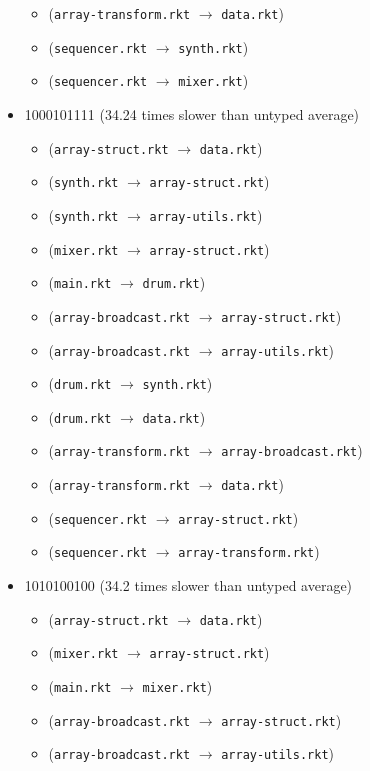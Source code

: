 \documentclass{article}
\newcommand{\mono}[1]{\texttt{#1}}
\begin{document}
\begin{itemize}
\begin{itemize}
  \item (\mono{array-transform.rkt} $\rightarrow$ \mono{data.rkt})
  \item (\mono{sequencer.rkt} $\rightarrow$ \mono{synth.rkt})
  \item (\mono{sequencer.rkt} $\rightarrow$ \mono{mixer.rkt})
  \end{itemize}
\item 1000101111 (34.24 times slower than untyped average)
  \begin{itemize}
  \item (\mono{array-struct.rkt} $\rightarrow$ \mono{data.rkt})
  \item (\mono{synth.rkt} $\rightarrow$ \mono{array-struct.rkt})
  \item (\mono{synth.rkt} $\rightarrow$ \mono{array-utils.rkt})
  \item (\mono{mixer.rkt} $\rightarrow$ \mono{array-struct.rkt})
  \item (\mono{main.rkt} $\rightarrow$ \mono{drum.rkt})
  \item (\mono{array-broadcast.rkt} $\rightarrow$ \mono{array-struct.rkt})
  \item (\mono{array-broadcast.rkt} $\rightarrow$ \mono{array-utils.rkt})
  \item (\mono{drum.rkt} $\rightarrow$ \mono{synth.rkt})
  \item (\mono{drum.rkt} $\rightarrow$ \mono{data.rkt})
  \item (\mono{array-transform.rkt} $\rightarrow$ \mono{array-broadcast.rkt})
  \item (\mono{array-transform.rkt} $\rightarrow$ \mono{data.rkt})
  \item (\mono{sequencer.rkt} $\rightarrow$ \mono{array-struct.rkt})
  \item (\mono{sequencer.rkt} $\rightarrow$ \mono{array-transform.rkt})
  \end{itemize}
\item 1010100100 (34.2 times slower than untyped average)
  \begin{itemize}
  \item (\mono{array-struct.rkt} $\rightarrow$ \mono{data.rkt})
  \item (\mono{mixer.rkt} $\rightarrow$ \mono{array-struct.rkt})
  \item (\mono{main.rkt} $\rightarrow$ \mono{mixer.rkt})
  \item (\mono{array-broadcast.rkt} $\rightarrow$ \mono{array-struct.rkt})
  \item (\mono{array-broadcast.rkt} $\rightarrow$ \mono{array-utils.rkt})

\end{itemize}
\end{itemize}
\end{document}
